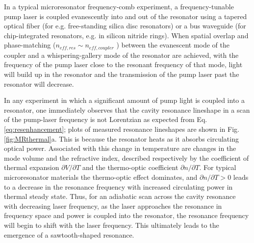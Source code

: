 In a typical microresonator frequency-comb experiment, a frequency-tunable pump laser is coupled evanescently into and out of the resonator using a tapered optical fiber \cite{Knight1997,Spillane2003} (for e.g. free-standing silica disc resonators) or a bus waveguide (for chip-integrated resonators, e.g. in silicon nitride rings). When spatial overlap and phase-matching ($n_{eff,res}\sim n_{eff,coupler}$ \cite{ShahHosseini2010}) between the evanescent mode of the coupler and a whispering-gallery mode of the resonator are achieved, with the frequency of the pump laser close to the resonant frequency of that mode, light will build up in the resonator and the transmission of the pump laser past the resonator will decrease.

In any experiment in which a significant amount of pump light is coupled into a resonator, one immediately observes that the cavity resonance lineshape in a scan of the pump-laser frequency is not Lorentzian as expected from Eq. \ref{eq:resenhancement}; plots of measured resonance lineshapes are shown in Fig. \ref{fig:MRthermal}a. This is because the resonator heats as it absorbs circulating optical power. Associated with this change in temperature are changes in the mode volume and the refractive index, described respectively by the coefficient of thermal expansion $\partial V/\partial T$ and the thermo-optic coefficient $\partial n/\partial T$. For typical microresonator materials the thermo-optic effect dominates, and $\partial n/\partial T>0$ leads to a decrease in the resonance frequency with increased circulating power in thermal steady state. Thus, for an adiabatic scan across the cavity resonance with decreasing laser frequency, as the laser approaches the resonance in frequency space and power is coupled into the resonator, the resonance frequency will begin to shift with the laser frequency. This ultimately leads to the emergence of a sawtooth-shaped resonance.



